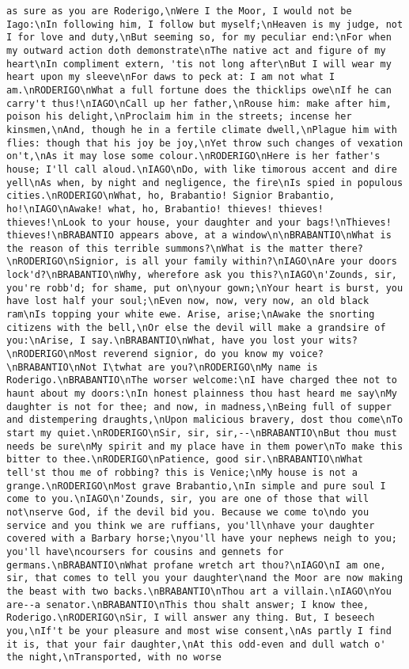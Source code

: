 \begin{verbatim}
as sure as you are Roderigo,\nWere I the Moor, I would not be Iago:\nIn following him, I follow but myself;\nHeaven is my judge, not I for love and duty,\nBut seeming so, for my peculiar end:\nFor when my outward action doth demonstrate\nThe native act and figure of my heart\nIn compliment extern, 'tis not long after\nBut I will wear my heart upon my sleeve\nFor daws to peck at: I am not what I am.\nRODERIGO\nWhat a full fortune does the thicklips owe\nIf he can carry't thus!\nIAGO\nCall up her father,\nRouse him: make after him, poison his delight,\nProclaim him in the streets; incense her kinsmen,\nAnd, though he in a fertile climate dwell,\nPlague him with flies: though that his joy be joy,\nYet throw such changes of vexation on't,\nAs it may lose some colour.\nRODERIGO\nHere is her father's house; I'll call aloud.\nIAGO\nDo, with like timorous accent and dire yell\nAs when, by night and negligence, the fire\nIs spied in populous cities.\nRODERIGO\nWhat, ho, Brabantio! Signior Brabantio, ho!\nIAGO\nAwake! what, ho, Brabantio! thieves! thieves! thieves!\nLook to your house, your daughter and your bags!\nThieves! thieves!\nBRABANTIO appears above, at a window\n\nBRABANTIO\nWhat is the reason of this terrible summons?\nWhat is the matter there?\nRODERIGO\nSignior, is all your family within?\nIAGO\nAre your doors lock'd?\nBRABANTIO\nWhy, wherefore ask you this?\nIAGO\n'Zounds, sir, you're robb'd; for shame, put on\nyour gown;\nYour heart is burst, you have lost half your soul;\nEven now, now, very now, an old black ram\nIs topping your white ewe. Arise, arise;\nAwake the snorting citizens with the bell,\nOr else the devil will make a grandsire of you:\nArise, I say.\nBRABANTIO\nWhat, have you lost your wits?\nRODERIGO\nMost reverend signior, do you know my voice?\nBRABANTIO\nNot I\twhat are you?\nRODERIGO\nMy name is Roderigo.\nBRABANTIO\nThe worser welcome:\nI have charged thee not to haunt about my doors:\nIn honest plainness thou hast heard me say\nMy daughter is not for thee; and now, in madness,\nBeing full of supper and distempering draughts,\nUpon malicious bravery, dost thou come\nTo start my quiet.\nRODERIGO\nSir, sir, sir,--\nBRABANTIO\nBut thou must needs be sure\nMy spirit and my place have in them power\nTo make this bitter to thee.\nRODERIGO\nPatience, good sir.\nBRABANTIO\nWhat tell'st thou me of robbing? this is Venice;\nMy house is not a grange.\nRODERIGO\nMost grave Brabantio,\nIn simple and pure soul I come to you.\nIAGO\n'Zounds, sir, you are one of those that will not\nserve God, if the devil bid you. Because we come to\ndo you service and you think we are ruffians, you'll\nhave your daughter covered with a Barbary horse;\nyou'll have your nephews neigh to you; you'll have\ncoursers for cousins and gennets for germans.\nBRABANTIO\nWhat profane wretch art thou?\nIAGO\nI am one, sir, that comes to tell you your daughter\nand the Moor are now making the beast with two backs.\nBRABANTIO\nThou art a villain.\nIAGO\nYou are--a senator.\nBRABANTIO\nThis thou shalt answer; I know thee, Roderigo.\nRODERIGO\nSir, I will answer any thing. But, I beseech you,\nIf't be your pleasure and most wise consent,\nAs partly I find it is, that your fair daughter,\nAt this odd-even and dull watch o' the night,\nTransported, with no worse 
\end{verbatim}
